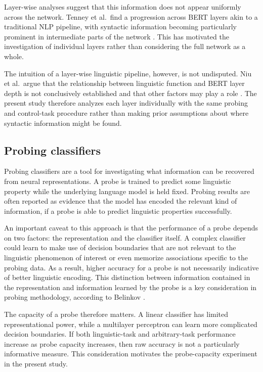 \documentclass[12pt,a4paper]{article}
\begin{document}
Layer-wise analyses suggest that this information does not appear uniformly across the network. Tenney et al.\ find a progression across BERT layers akin to a traditional NLP pipeline, with syntactic information becoming particularly prominent in intermediate parts of the network \cite{tenney2019bert}. This has motivated the investigation of individual layers rather than considering the full network as a whole.

The intuition of a layer-wise linguistic pipeline, however, is not undisputed. Niu et al.\ argue that the relationship between linguistic function and BERT layer depth is not conclusively established and that other factors may play a role \cite{niu2022pipeline}. The present study therefore analyzes each layer individually with the same probing and control-task procedure rather than making prior assumptions about where syntactic information might be found.

\subsection{Probing classifiers}

Probing classifiers are a tool for investigating what information can be recovered from neural representations. A probe is trained to predict some linguistic property while the underlying language model is held fixed. Probing results are often reported as evidence that the model has encoded the relevant kind of information, if a probe is able to predict linguistic properties successfully.

An important caveat to this approach is that the performance of a probe depends on two factors: the representation and the classifier itself. A complex classifier could learn to make use of decision boundaries that are not relevant to the linguistic phenomenon of interest or even memorize associations specific to the probing data. As a result, higher accuracy for a probe is not necessarily indicative of better linguistic encoding. This distinction between information contained in the representation and information learned by the probe is a key consideration in probing methodology, according to Belinkov \cite{belinkov2022probing}.

The capacity of a probe therefore matters. A linear classifier has limited representational power, while a multilayer perceptron can learn more complicated decision boundaries. If both linguistic-task and arbitrary-task performance increase as probe capacity increases, then raw accuracy is not a particularly informative measure. This consideration motivates the probe-capacity experiment in the present study.
\end{document}

